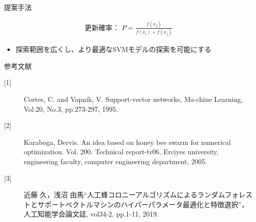 \documentclass[12pt, cjk, dvipdfmx]{beamer}
\begin{document}
\begin{frame}
\begin{columns}[t]
\begin{column}{0.490\linewidth}
\begin{mybox}{提案手法}
\begin{itemize}
              \end{itemize}
              \vspace{10mm}
              \begin{align*}
              \text{更新確率： }  P = \frac{f(x_j)}{f(x_i)+f(x_j)}
               \end{align*}
               \begin{itemize}
                \item 探索範囲を広くし、より最適なSVMモデルの探索を可能にする
              \end{itemize} 
            \end{mybox}
            
            \begin{mybox}{参考文献}
              \scriptsize
              \begin{description}
                \item[{[1]}] Cortes, C. and Vapnik, V. Support-vector networks, Ma-chine Learning, Vol.20, No.3, pp.273-297, 1995.
                \item[{[2]}] Karaboga, Dervis. An idea based on honey bee swarm for numerical optimization. Vol. 200. Technical report-tr06, Erciyes university, engineering faculty, computer engineering department, 2005.
                \item[{[3]}] 近藤 久，浅沼 由馬“人工蜂コロニーアルゴリズムによるランダムフォレストとサポートベクトルマシンのハイパーパラメータ最適化と特徴選択”，人工知能学会論文誌, vol34-2, pp.1-11, 2019.
              \end{description}
            \end{mybox}
        \end{column}
      \end{columns}
  \end{frame}
\end{document}
